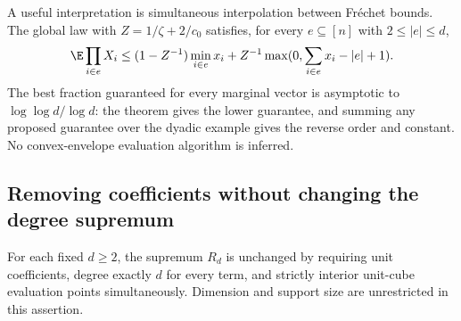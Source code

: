A useful interpretation is simultaneous interpolation between Fr\'echet
bounds. The global law with $Z=1/\zeta+2/c_0$ satisfies, for every
$e\subseteq[n]$ with $2\le|e|\le d$,
\begin{equation}\label{eq:simultaneous-frechet}
 \E\prod_{i\in e}X_i\le(1-Z^{-1})\min_{i\in e}x_i
       +Z^{-1}\max(0,\sum_{i\in e}x_i-|e|+1).
\end{equation}
The best fraction guaranteed for every marginal vector is asymptotic to
$\log\log d/\log d$: the theorem gives the lower guarantee, and summing
any proposed guarantee over the dyadic example gives the reverse order
and constant. No convex-envelope evaluation algorithm is inferred.

\subsection{Removing coefficients without changing the degree supremum}
\begin{theorem}
\label{thm:coefficient-removal}
For each fixed $d\ge2$, the supremum $R_d$ is unchanged by requiring
unit coefficients, degree exactly $d$ for every term, and strictly interior
unit-cube evaluation points simultaneously. Dimension and support size
are unrestricted in this assertion.
\end{theorem}
